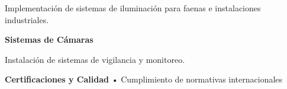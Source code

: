 \documentclass[a4paper,11pt]{article}
\begin{document}
{{\begin{center}
\begin{minipage}{18cm}
\begin{minipage}[t]{5.5cm}
{{                    \vspace{0.3cm}
                    
                    {\small Implementación de sistemas de iluminación para faenas e instalaciones industriales.}
                    \vspace{0.5cm}
                }}
            \end{minipage}
            \hfill
            \begin{minipage}[t]{5.5cm}
                \colorbox{blancoJM}{\parbox[t][4.5cm][t]{5.3cm}{
                    \vspace{0.5cm}
                    \centering
                    {\color{naranjaJM}\faVideo\quad}{\Large\color{azulJM}\textbf{Sistemas de Cámaras}}
                    
                    \vspace{0.3cm}
                    
                    {\small Instalación de sistemas de vigilancia y monitoreo.}
                    \vspace{0.5cm}
                }}
            \end{minipage}
            
            \vspace{1.5cm}
            
            \colorbox{naranjaJM!10}{\parbox{17cm}{
                \vspace{0.5cm}
                \centering
                \Large\textbf{\color{naranjaJM}Certificaciones y Calidad} • \color{grisOscuro}Cumplimiento de normativas internacionales
                \vspace{0.5cm}
            }}
        \end{minipage}
    \end{center}
    
    \vspace{2cm}
}}
\end{document}
